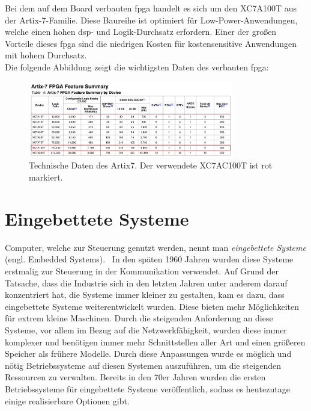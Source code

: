 Bei dem auf dem Board verbauten \ac{fpga} handelt es sich um den  XC7A100T aus der Artix-7-Familie. Diese Baureihe ist optimiert für Low-Power-Anwendungen, welche einen hohen \ac{dsp}- und Logik-Durchsatz erfordern. Einer der großen Vorteile
dieses \ac{fpga} sind die niedrigen Kosten für kostensensitive Anwendungen mit hohem Durchsatz.\\
Die folgende Abbildung zeigt die wichtigsten Daten des verbauten \ac{fpga}:~\cite{artix7}\\


\begin{figure}[H]
\centering
\includegraphics[width=0.8\textwidth]{Hauptteil/artix7.png}
\caption{Technische Daten des Artix7. Der verwendete XC7AC100T ist rot markiert.~\cite{artix7}}\label{fig:artix7}
\end{figure}

\section{Eingebettete Systeme}\label{kap:eingebettetesysteme}

Computer, welche zur Steuerung genutzt werden, nennt man \emph{eingebettete Systeme} (engl. Embedded Systems).~\cite{ibm} In den späten 1960 Jahren wurden diese Systeme erstmalig zur Steuerung in der Kommunikation verwendet. Auf Grund der Tatsache,
dass die Industrie sich in den letzten Jahren unter anderem darauf konzentriert hat, die Systeme immer kleiner zu gestalten, kam es dazu, dass eingebettete Systeme weiterentwickelt wurden. Diese bieten mehr Möglichkeiten für extrem kleine Maschinen.
Durch die steigenden Anforderung an diese Systeme, vor allem im Bezug auf die Netzwerkfähigkeit, wurden diese immer komplexer und benötigen immer mehr Schnittstellen aller Art und einen größeren Speicher als frühere Modelle. Durch diese Anpassungen wurde es
möglich und nötig Betriebssysteme auf diesen Systemen auszuführen, um die steigenden Ressourcen zu verwalten. Bereits in den 70er Jahren wurden die ersten Betriebssysteme für eingebettete Systeme veröffentlich, sodass es heutezutage einige
realisierbare Optionen gibt.\cite{ibm}\\


